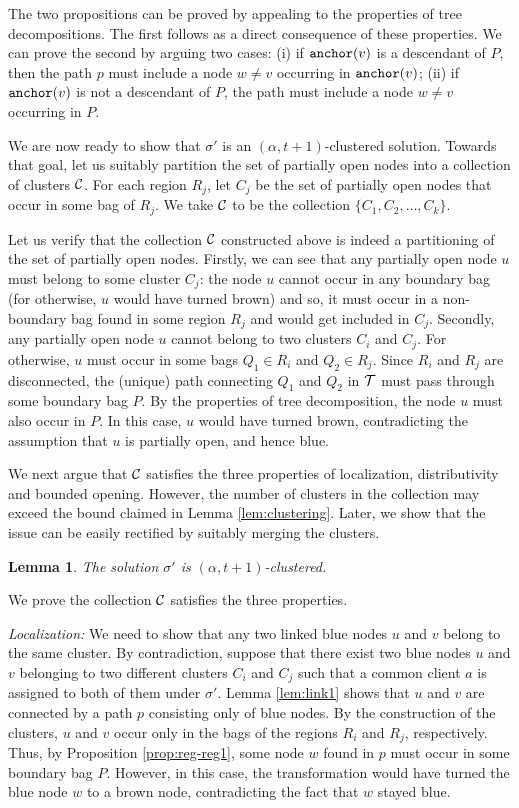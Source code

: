 \documentclass[11pt]{article}
\newtheorem{lemma}[theorem]{Lemma}
\newcommand{\anc} {{\tt anchor}}
\newcommand{\calC} {{\cal C}}
\newcommand{\calT} {{\cal T}}
\begin{document}
The two propositions can be proved by appealing to the properties of tree decompositions.
The first follows as a direct consequence of these properties.
We can prove the second by arguing two cases:
(i) if $\anc(v)$ is a descendant of $P$, then 
the path $p$ must include a node $w\neq v$ occurring in $\anc(v)$;
(ii) if $\anc(v)$ is not a descendant of $P$,
the path must include a node $w\neq v$ occurring in $P$.

We are now ready to show that $\sigma'$ is an $(\alpha, t+1)$-clustered solution.
Towards that goal, let us suitably partition the set of partially open nodes into a collection of clusters $\calC$.  
For each region $R_j$, let $C_j$ be the set of partially open nodes that occur in some bag of $R_j$.
We take $\calC$ to be the collection $\{C_1, C_2, \ldots, C_k\}$.

Let us verify that the collection $\calC$ constructed above is indeed a partitioning of the set of partially open nodes.
Firstly, we can see that any partially open node $u$ must belong to some cluster $C_j$:
the node $u$ cannot occur in any boundary bag (for otherwise, $u$ would have turned brown)
and so, it must occur in a non-boundary bag found in some region $R_j$ and would get included in $C_j$.
Secondly, any partially open node $u$ cannot belong to two clusters $C_i$ and $C_j$.
For otherwise, $u$ must occur in some bags $Q_1\in R_i$ and $Q_2\in R_j$.
Since $R_i$ and $R_j$ are disconnected, the (unique) path connecting $Q_1$ and $Q_2$ in $\calT$
must pass through some boundary bag $P$.
By the properties of tree decomposition, the node $u$ must also occur in $P$.
In this case, $u$ would have turned brown, contradicting the assumption that $u$ is partially open, and hence blue.

We next argue that $\calC$ satisfies the three properties of localization, distributivity and
bounded opening. However, the number of clusters in the collection may exceed the bound claimed in Lemma \ref{lem:clustering}.
Later, we show that the issue can be easily rectified by suitably merging the clusters.


\begin{lemma}
\label{lem:bdd-cluster}
The solution $\sigma'$ is $(\alpha, t+1)$-clustered.
\end{lemma}
\proof
We prove the collection $\calC$ satisfies the three properties.

{\it Localization: }
We need to show that any two linked blue nodes $u$ and $v$ belong to the same cluster.
By contradiction, suppose that there exist two blue nodes $u$ and $v$ belonging to two different clusters $C_i$ and $C_j$
such that a common client $a$ is assigned to both of them under $\sigma'$.
Lemma \ref{lem:link1} shows that $u$ and $v$ are connected by a path $p$ consisting only of blue nodes.
By the construction of the clusters, $u$ and $v$ occur only in the bags of the regions $R_i$ and $R_j$, respectively.
Thus, by Proposition \ref{prop:reg-reg1}, some node $w$ found in $p$ must occur in some boundary bag $P$.
However, in this case, the transformation would have turned the blue node $w$ to a brown node,
contradicting the fact that $w$ stayed blue.
\end{document}
